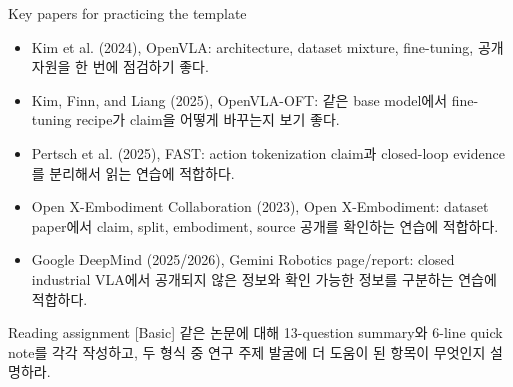 \begin{sourcebox}{Key papers for practicing the template}
\begin{itemize}
  \item Kim et al. (2024), OpenVLA: architecture, dataset mixture, fine-tuning, 공개 자원을 한 번에 점검하기 좋다.
  \item Kim, Finn, and Liang (2025), OpenVLA-OFT: 같은 base model에서 fine-tuning recipe가 claim을 어떻게 바꾸는지 보기 좋다.
  \item Pertsch et al. (2025), FAST: action tokenization claim과 closed-loop evidence를 분리해서 읽는 연습에 적합하다.
  \item Open X-Embodiment Collaboration (2023), Open X-Embodiment: dataset paper에서 claim, split, embodiment, source 공개를 확인하는 연습에 적합하다.
  \item Google DeepMind (2025/2026), Gemini Robotics page/report: closed industrial VLA에서 공개되지 않은 정보와 확인 가능한 정보를 구분하는 연습에 적합하다.
\end{itemize}
\end{sourcebox}

\begin{assignmentbox}{Reading assignment [Basic]}
같은 논문에 대해 13-question summary와 6-line quick note를 각각 작성하고, 두 형식 중 연구 주제 발굴에 더 도움이 된 항목이 무엇인지 설명하라.
\end{assignmentbox}
